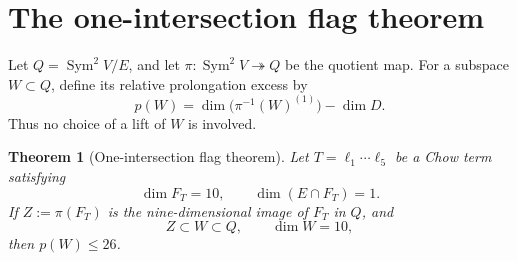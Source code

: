 \documentclass[11pt,reqno]{amsart}
\newtheorem{theorem}{Theorem}[section]
\theoremstyle{definition}
\newcommand{\Sym}{\operatorname{Sym}}
\begin{document}
\section{The one-intersection flag theorem}\label{sec:flag}

Let \(Q=\Sym^2V/E\), and let \(\pi:\Sym^2V\twoheadrightarrow Q\) be the
quotient map. For a subspace \(W\subset Q\), define its relative
prolongation excess by
\[
 p(W)=\dim\bigl(\pi^{-1}(W)^{(1)}\bigr)-\dim D.
\]
Thus no choice of a lift of \(W\) is involved.

\begin{theorem}[One-intersection flag theorem]\label{thm:flag}
Let \(T=\ell_1\cdots\ell_5\) be a Chow term satisfying
\[
 \dim F_T=10,\qquad \dim(E\cap F_T)=1.
\]
If \(Z:=\pi(F_T)\) is the nine-dimensional image of \(F_T\) in \(Q\), and
\[
 Z\subset W\subset Q,\qquad \dim W=10,
\]
then \(p(W)\le26\).
\end{theorem}
\end{document}
